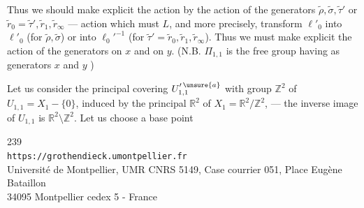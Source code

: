 Thus we should make explicit the action
by the action of the generators $\widetilde\rho,\widetilde\sigma,\widetilde\tau'$ or $\widetilde r_0=\widetilde\tau',\widetilde r_1,\widetilde r_\infty$ --- action which must  $L$, and more precisely, transform $\ell'_0$ into $\ell'_0$ (for $\widetilde\rho,\widetilde\sigma$) or into $\ell_0'^{-1}$ (for $\widetilde\tau'=\widetilde r_0,\widetilde r_1,\widetilde r_\infty$). Thus we must make explicit the action of the generators on $x$ and on $y$. (N.B. $\Pi_{1,1}$ is the free group having as generators $x$ and $y$ \unsure{!})

Let us consider the principal covering $U_{1,1}^{\prime\,\unsure{a}}$ with group $\mathbb Z^2$ of $U_{1,1}=X_1-\{0\}$, induced by the principal  $\mathbb R^2$ of $X_1=\mathbb R^2/\mathbb Z^2$, --- the inverse image of $U_{1,1}$ is $\mathbb R^2\setminus\mathbb Z^2$. Let us choose a base point 

\begin{center}
239\\
\texttt{https://grothendieck.umontpellier.fr}\\
Université de Montpellier, UMR CNRS 5149, Case courrier 051, Place Eugène Bataillon\\
34095 Montpellier cedex 5 - France
\end{center}